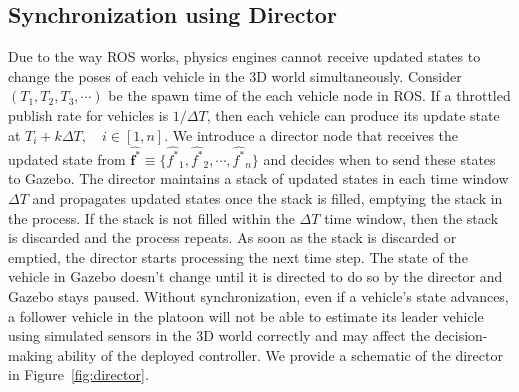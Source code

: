 \documentclass[aps,pra,twocolumn,notitlepage,nofootinbib,superscriptaddress]{revtex4-1}
\def\fbf{{\mathbf f}}
\begin{document}
\subsection{Synchronization using Director}
\label{eq:timing}
Due to the way ROS works, physics engines cannot receive updated states to change the poses of each vehicle in the 3D world simultaneously. Consider $(T_1, T_2, T_3, \cdots)$ be the spawn time of the each vehicle node in ROS. If a throttled publish rate for vehicles is $1/\Delta T$, then each vehicle can produce its update state at $T_i + k\Delta T, \quad i \in [1, n]$. We introduce a director node that receives the updated state from $\hat{\fbf^*} \equiv \{\hat{f^*}_1, \hat{f^*}_2, \cdots, \hat{f^*}_n\}$ and decides when to send these states to Gazebo. The director maintains a stack of updated states in each time window $\Delta T$ and propagates updated states once the stack is filled, emptying the stack in the process. If the stack is not filled within the $\Delta T$ time window, then the stack is discarded and the process repeats. As soon as the stack is discarded or emptied, the director starts processing the next time step. The state of the vehicle in Gazebo doesn't change until it is directed to do so by the director and Gazebo stays paused.
Without synchronization, even if a vehicle's state advances, a follower vehicle in the platoon will not be able to estimate its leader vehicle using simulated sensors in the 3D world correctly and may affect the decision-making ability of the deployed controller. We provide a schematic of the director in Figure~\ref{fig:director}.
\end{document}
